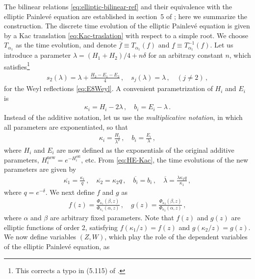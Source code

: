 \documentclass[11pt, a4paper]{article}
\theoremstyle{definition}
\begin{document}
The bilinear relations \eqref{eq:elliptic-bilinear-ref} and their equivalence with the elliptic Painlev\'e equation are established in section~5 of \cite{Kajiwara:2015}; here we summarize the construction. The discrete time evolution of the elliptic Painlev\'e equation is given by a Kac translation \eqref{eq:Kac-traslation} with respect to a simple root. We choose $ T_{\alpha_1} $ as the time evolution, and denote $ \overline{f} \equiv T_{\alpha_1}(f) $ and $ \underline{f} \equiv T_{\alpha_1}^{-1}(f) $. Let us introduce a parameter $ \lambda = (H_1+H_2)/4 + n\delta $ for an arbitrary constant $ n $, which satisfies\footnote{This corrects a typo in (5.115) of \cite{Kajiwara:2015}.}
\begin{align}
    s_2(\lambda) = \lambda + \frac{H_2 - E_1-E_2}{4} \, , \quad
    s_j(\lambda) = \lambda \, , \quad (j \neq 2) \, ,
\end{align}
for the Weyl reflections \eqref{eq:E8Weyl}. A convenient parametrization of $ H_i $ and $ E_i $ is
\begin{align}
    \kappa_i = H_i - 2\lambda \, , \quad
    b_i = E_i - \lambda \, .
\end{align}
Instead of the additive notation, let us use the \emph{multiplicative notation}, in which all parameters are exponentiated, so that
\begin{align}\label{eq:kap-v-parameter}
    \kappa_i = \frac{H_i}{\lambda^2} \, , \quad
    b_i = \frac{E_i}{\lambda} \, ,
\end{align}
where $ H_i $ and $ E_i $ are now defined as the exponentials of the original additive parameters, $ H_i^{\mathrm{new}} = e^{-H_i^{\mathrm{old}}} $, etc. From \eqref{eq:HE-Kac}, the time evolutions of the new parameters are given by
\begin{align}\label{eq:Kac-kappa}
    \overline{\kappa_1} = \frac{\kappa_1}{q} \, , \quad
    \overline{\kappa_2} = \kappa_2 q \, , \quad
    \overline{b_i} = b_i \, , \quad
    \overline{\lambda} = \frac{\lambda \kappa_2 q}{\kappa_1} \, ,
\end{align}
where $ q=e^{-\delta} $. We next define $ f $ and $ g $ as
\begin{align}
    f(z) = \frac{\Phi_{\kappa_1}(\beta,z)}{\Phi_{\kappa_1}(\alpha,z)} \, , \quad
    g(z) = \frac{\Phi_{\kappa_2}(\beta,z)}{\Phi_{\kappa_2}(\alpha,z)} \, ,
\end{align}
where $ \alpha $ and $ \beta $ are arbitrary fixed parameters. Note that $ f(z) $ and $ g(z) $ are elliptic functions of order 2, satisfying $ f(\kappa_1/z)=f(z) $ and $ g(\kappa_2/z)=g(z) $. We now define variables $ (Z,W) $, which play the role of the dependent variables of the elliptic Painlev\'e equation, as
\end{document}
